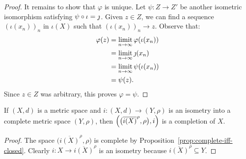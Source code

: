 \begin{theorem}
\begin{proof}
                It remains to show that $\varphi$ is unique. Let $\psi:Z \rightarrow Z'$ be another isometric isomorphism satisfying $\psi \circ \iota = \jmath$. Given $z \in Z$, we can find a sequence $(\iota(x_n))_n$ in $\iota(X)$ such that $(\iota(x_n))_n \rightarrow z$. Observe that:
                    \begin{equation*}
                    \begin{split}
                        \varphi(z)
                        & = \operatorname*{limit}_{n \rightarrow \infty} \varphi(\iota(x_n)) \\
                        & = \operatorname*{limit}_{n \rightarrow \infty} \jmath(x_n) \\
                        & = \operatorname*{limit}_{n \rightarrow \infty} \psi(\iota(x_n)) \\
                        & = \psi(z).
                    \end{split}
                    \end{equation*}
                Since $z \in Z$ was arbitrary, this proves $\varphi = \psi$. 
            \end{proof}
    \end{theorem}

    \begin{lemma}
        If $(X,d)$ is a metric space and $i:(X,d) \rightarrow (Y,\rho)$ is an isometry into a complete metric space $(Y,\rho)$, then $\Bigl( \bigl(\overline{i(X)}^\rho , \rho\bigr), i\Bigr)$ is a completion of $X$.
    \end{lemma}
        \begin{proof}
            The space $\bigl(\overline{i(X)}^\rho,\rho\bigr)$ is complete by Proposition~\ref{prop:complete-iff-closed}. Clearly $i:X \rightarrow \overline{i(X)}^\rho$ is an isometry because $\overline{i(X)}^\rho \subseteq Y$.
        \end{proof}

